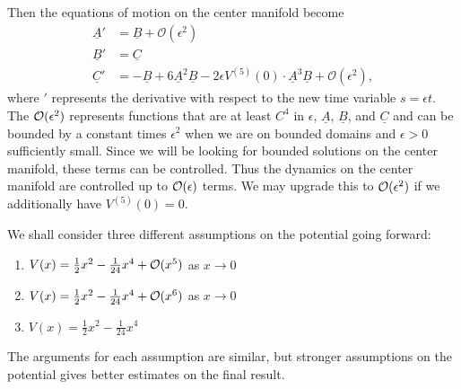 Then the equations of motion on the center manifold become
\begin{equation}\label{eqns-center-manifold}
\begin{aligned}
	\underline A ' &= \underline B + \mathcal O(\epsilon^2) \\
	\underline B ' &= \underline C \\
	\underline C ' &= - \underline B + 6 \underline A^2 \underline B - 2 \epsilon V^{(5)}(0) \cdot \underline A^3\underline B +  \mathcal O(\epsilon^2),
\end{aligned}
\end{equation}
where \('\) represents the derivative with respect to the new time variable \(s = \epsilon t\). The \(\mathcal{O}(\epsilon^2)\) represents functions that are at least \(C^4\) in \(\epsilon\), \(\underline A\), \(\underline B\), and \(\underline C\) and can be bounded by a constant times \(\epsilon^2\) when we are on bounded domains and \(\epsilon >0\) sufficiently small. Since we will be looking for bounded solutions on the center manifold, these terms can be controlled. Thus the dynamics on the center manifold are controlled up to \(\mathcal{O}(\epsilon)\) terms. We may upgrade this to \(\mathcal{O}(\epsilon^2)\) if we additionally have \(V^{(5)}(0) = 0\).

We shall consider three different assumptions on the potential going forward:
\begin{enumerate}[label = (H\arabic*)]
	\item \(V(x) = \frac 12 x^2 - \frac 1 {24} x^4 + \mathcal{O}(x^5)\) as \(x\to 0\)
	\item \(V(x) = \frac 12 x^2 - \frac 1 {24} x^4 + \mathcal{O}(x ^6)\) as \(x \to 0\)
	\item \(V(x) = \frac 12 x^2 - \frac 1 {24} x^4\)
\end{enumerate}
The arguments for each assumption are similar, but stronger assumptions on the potential gives better estimates on the final result.

